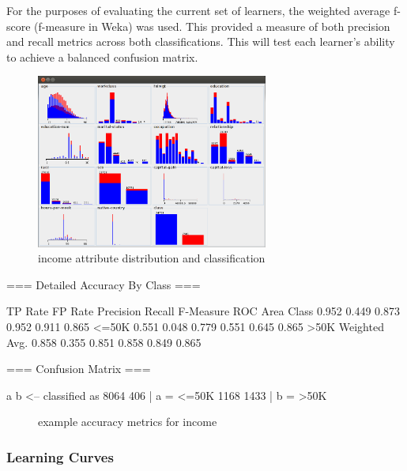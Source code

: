 \documentclass{sig-alternate}
\begin{document}
For the purposes of evaluating the current set of learners, the weighted average f-score (f-measure in Weka) was used. This provided a measure of both precision and recall metrics across both classifications. This will test each learner's ability to achieve a balanced confusion matrix.


\begin{figure}[!htbp]
    \centering
    \includegraphics[width=3in]{data/adult/ad-data-viz.png}
    \caption{income attribute distribution and classification \label{ad-data-viz}}
\end{figure} 

\tiny
\begin{verbbox}

=== Detailed Accuracy By Class ===

               TP Rate   FP Rate   Precision   Recall  F-Measure   ROC Area  Class
                 0.952     0.449      0.873     0.952     0.911      0.865     <=50K
                 0.551     0.048      0.779     0.551     0.645      0.865     >50K
Weighted Avg.    0.858     0.355      0.851     0.858     0.849      0.865

=== Confusion Matrix ===

    a    b   <-- classified as
 8064  406 |    a =  <=50K
 1168 1433 |    b =  >50K

\end{verbbox}
\normalsize

\begin{figure}[!htbp]
    \centering
    \theverbbox
    \caption{example accuracy metrics for income \label{ad-metrics}}
\end{figure}


\subsubsection{Learning Curves}
\end{document}
